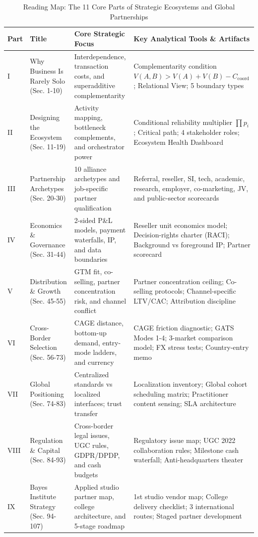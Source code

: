 \begin{table}[t]
\centering
\small
\caption{Reading Map: The 11 Core Parts of Strategic Ecosystems and Global Partnerships}
\label{tab:ch30_reading_map}
\begin{tabularx}{\textwidth}{p{1.2cm} p{3.2cm} p{4.6cm} X}
\toprule
\textbf{Part} & \textbf{Title} & \textbf{Core Strategic Focus} & \textbf{Key Analytical Tools \& Artifacts} \\
\midrule
I & Why Business Is Rarely Solo (Sec. 1-10) & Interdependence, transaction costs, and superadditive complementarity & Complementarity condition $V(A,B) > V(A) + V(B) - C_{\text{coord}}$; Relational View; 5 boundary types \\
II & Designing the Ecosystem (Sec. 11-19) & Activity mapping, bottleneck complements, and orchestrator power & Conditional reliability multiplier $\prod p_i$; Critical path; 4 stakeholder roles; Ecosystem Health Dashboard \\
III & Partnership Archetypes (Sec. 20-30) & 10 alliance archetypes and job-specific partner qualification & Referral, reseller, SI, tech, academic, research, employer, co-marketing, JV, and public-sector scorecards \\
IV & Economics \& Governance (Sec. 31-44) & 2-sided P\&L models, payment waterfalls, IP, and data boundaries & Reseller unit economics model; Decision-rights charter (RACI); Background vs foreground IP; Partner scorecard \\
V & Distribution \& Growth (Sec. 45-55) & GTM fit, co-selling, partner concentration risk, and channel conflict & Partner concentration ceiling; Co-selling protocols; Channel-specific LTV/CAC; Attribution discipline \\
VI & Cross-Border Selection (Sec. 56-73) & CAGE distance, bottom-up demand, entry-mode ladders, and currency & CAGE friction diagnostic; GATS Modes 1-4; 3-market comparison model; FX stress tests; Country-entry memo \\
VII & Global Positioning (Sec. 74-83) & Centralized standards vs localized interfaces; trust transfer & Localization inventory; Global cohort scheduling matrix; Practitioner content sensing; SLA architecture \\
VIII & Regulation \& Capital (Sec. 84-93) & Cross-border legal issues, UGC rules, GDPR/DPDP, and cash budgets & Regulatory issue map; UGC 2022 collaboration rules; Milestone cash waterfall; Anti-headquarters theater \\
IX & Bayes Institute Strategy (Sec. 94-107) & Applied studio partner map, college architecture, and 5-stage roadmap & 1st studio vendor map; College delivery checklist; 3 international routes; Staged partner development \\

\end{tabularx}
\end{table}

